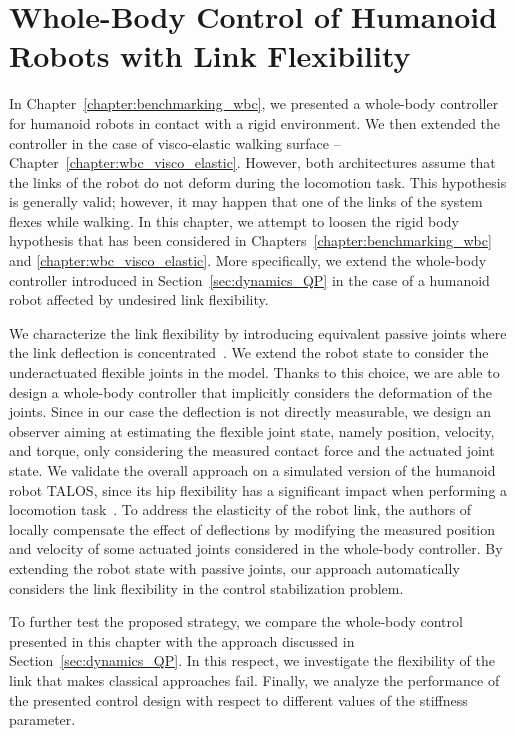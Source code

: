\chapter{Whole-Body Control of Humanoid Robots with Link Flexibility\label{chapter:flexible_joints}}

In Chapter~\ref{chapter:benchmarking_wbc}, we presented a whole-body controller for humanoid robots in contact with a rigid environment. We then extended the controller in the case of visco-elastic walking surface -- Chapter~\ref{chapter:wbc_visco_elastic}. However, both architectures assume that the links of the robot do not deform during the locomotion task. This hypothesis is generally valid; however, it may happen that one of the links of the system flexes while walking. In this chapter, we attempt to loosen the rigid body hypothesis that has been considered in Chapters~\ref{chapter:benchmarking_wbc} and \ref{chapter:wbc_visco_elastic}. More specifically, we extend the whole-body controller introduced in Section~\ref{sec:dynamics_QP} in the case of a humanoid robot affected by undesired link flexibility.
\par
We characterize the link flexibility by introducing equivalent passive joints where the link
deflection is concentrated~\citep{Nakaoka2007Constraint-basedMechanisms}. We extend the robot state to consider the
underactuated flexible joints in the model. Thanks to this choice, we are able to design a
whole-body controller that implicitly considers the deformation of the joints.
Since in our case the deflection is not directly measurable, we design an observer aiming at
estimating the flexible joint state, namely position, velocity, and torque, only considering the
measured contact force and the actuated joint state.
We validate the overall approach on a simulated version of the humanoid robot TALOS, since its hip
flexibility has a significant impact when performing a locomotion
task~\citep{Villa2022TorqueFlexibility}. To address the elasticity of the robot link, the authors of
\citep{Villa2022TorqueFlexibility} locally compensate the effect of deflections by modifying the
measured position and velocity of some actuated joints considered in the whole-body controller. By
extending the robot state with passive joints, our approach automatically considers the link
flexibility in the control stabilization problem.
\par
To further test the proposed strategy, we compare the whole-body control presented in this chapter with the approach discussed in Section~\ref{sec:dynamics_QP}. In this respect, we investigate the flexibility of the link that makes classical approaches fail. Finally, we analyze the performance of the presented control design with respect to different values of the stiffness parameter.
